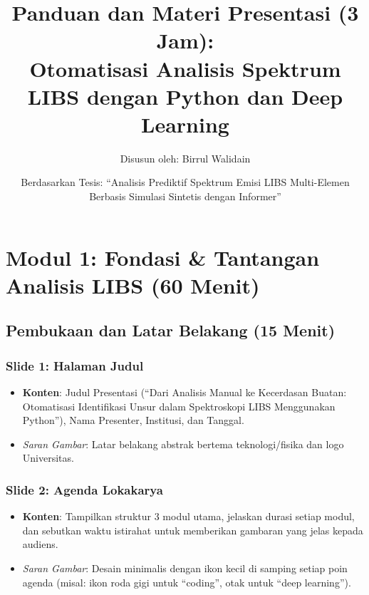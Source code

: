 \documentclass[12pt, a4paper]{article}
\title{\vspace{-2cm}\huge\bfseries Panduan dan Materi Presentasi (3 Jam): \\ \Large Otomatisasi Analisis Spektrum LIBS dengan Python dan Deep Learning}
\author{\large Disusun oleh: Birrul Walidain}
\date{\normalsize Berdasarkan Tesis: ``Analisis Prediktif Spektrum Emisi LIBS Multi-Elemen Berbasis Simulasi Sintetis dengan Informer''}
\begin{document}
\maketitle
\thispagestyle{empty}

\tableofcontents
\newpage

\section{Modul 1: Fondasi \& Tantangan Analisis LIBS (60 Menit)}

\subsection{Pembukaan dan Latar Belakang (15 Menit)}

\subsubsection*{Slide 1: Halaman Judul}
\begin{itemize}
    \item \textbf{Konten}: Judul Presentasi (``Dari Analisis Manual ke Kecerdasan Buatan: Otomatisasi Identifikasi Unsur dalam Spektroskopi LIBS Menggunakan Python''), Nama Presenter, Institusi, dan Tanggal.
    \item \textit{Saran Gambar}: Latar belakang abstrak bertema teknologi/fisika dan logo Universitas.
\end{itemize}

\subsubsection*{Slide 2: Agenda Lokakarya}
\begin{itemize}
    \item \textbf{Konten}: Tampilkan struktur 3 modul utama, jelaskan durasi setiap modul, dan sebutkan waktu istirahat untuk memberikan gambaran yang jelas kepada audiens.
    \item \textit{Saran Gambar}: Desain minimalis dengan ikon kecil di samping setiap poin agenda (misal: ikon roda gigi untuk ``coding'', otak untuk ``deep learning'').
\end{itemize}
\end{document}
